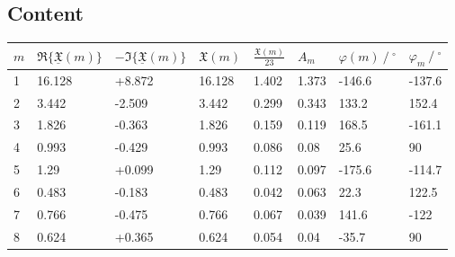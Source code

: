 \documentclass[12pt, a4paper]{article}
\begin{document}
\subsection{Content}
\begin{table}[H]
    \centering
    \begin{tabular}{@{}llllllll@{}} \toprule
        {\(m\)} & {\(\Re\{\underline{\mathfrak{X}}(m)\}\)} & {\(-\Im\{\underline{\mathfrak{X}}(m)\}\)} & {\(\mathfrak{X}(m)\)} & {\(\frac{\mathfrak{X}(m)}{23}\)} & {\(A_m\)} & {\(\varphi(m)\ /\ ^{\circ}\)} & {\(\varphi_m\ /\ ^{\circ}\)} \\ \midrule
        1       & 16.128                                   & +8.872                                    & 16.128                & 1.402                            & 1.373     & -146.6                        & -137.6                       \\
        2       & 3.442                                    & -2.509                                    & 3.442                 & 0.299                            & 0.343     & 133.2                         & 152.4                        \\
        3       & 1.826                                    & -0.363                                    & 1.826                 & 0.159                            & 0.119     & 168.5                         & -161.1                       \\
        4       & 0.993                                    & -0.429                                    & 0.993                 & 0.086                            & 0.08      & 25.6                          & 90                           \\ \midrule
        5       & 1.29                                     & +0.099                                    & 1.29                  & 0.112                            & 0.097     & -175.6                        & -114.7                       \\
        6       & 0.483                                    & -0.183                                    & 0.483                 & 0.042                            & 0.063     & 22.3                          & 122.5                        \\
        7       & 0.766                                    & -0.475                                    & 0.766                 & 0.067                            & 0.039     & 141.6                         & -122                         \\
        8       & 0.624                                    & +0.365                                    & 0.624                 & 0.054                            & 0.04      & -35.7                         & 90                           \\ \midrule

\end{tabular}
\end{table}
\end{document}
